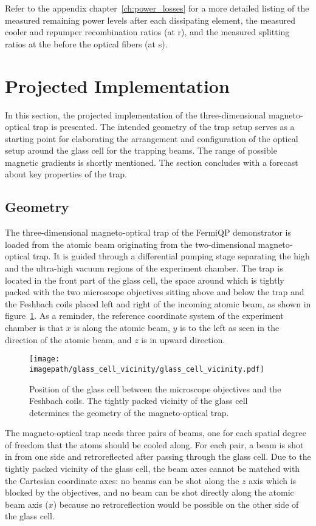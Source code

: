 Refer to the appendix chapter~\ref{ch:power_losses} for a more detailed listing of the  measured remaining power levels after each dissipating element, the measured cooler and repumper recombination ratios (at r), and the measured splitting ratios at the before the optical fibers (at s).


\section{Projected Implementation}\label{ch:projected_implementation}
In this section, the projected implementation of the three-dimensional magneto-optical trap is presented. The intended geometry of the trap setup serves as a starting point for elaborating the arrangement and configuration of the optical setup around the glass cell for the trapping beams. The range of possible magnetic gradients is shortly mentioned. The section concludes with a forecast about key properties of the trap.

\subsection*{Geometry}
The three-dimensional magneto-optical trap of the FermiQP demonstrator is loaded from the atomic beam originating from the two-dimensional magneto-optical trap. It is guided through a differential pumping stage separating the high and the ultra-high vacuum regions of the experiment chamber. The trap is located in the front part of the glass cell, the space around which is tightly packed with the two microscope objectives sitting above and below the trap and the Feshbach coils placed left and right of the incoming atomic beam, as shown in figure~\ref{fig:glass_cell_vicinity}. As a reminder, the reference coordinate system of the experiment chamber is that $x$ is along the atomic beam, $y$ is to the left as seen in the direction of the atomic beam, and $z$ is in upward direction.

\begin{figure}
    \centering
    \texttt{[image: \\imagepath/glass\_cell\_vicinity/glass\_cell\_vicinity.pdf]}
    \caption{Position of the glass cell between the microscope objectives and the Feshbach coils. The tightly packed vicinity of the glass cell determines the geometry of the magneto-optical trap.}\label{fig:glass_cell_vicinity}
\end{figure}

The magneto-optical trap needs three pairs of beams, one for each spatial degree of freedom that the atoms should be cooled along. For each pair, a beam is shot in from one side and retroreflected after passing through the glass cell. Due to the tightly packed vicinity of the glass cell, the beam axes cannot be matched with the Cartesian coordinate axes: no beams can be shot along the $z$ axis which is blocked by the objectives, and no beam can be shot directly along the atomic beam axis ($x$) because no retroreflection would be possible on the other side of the glass cell.

